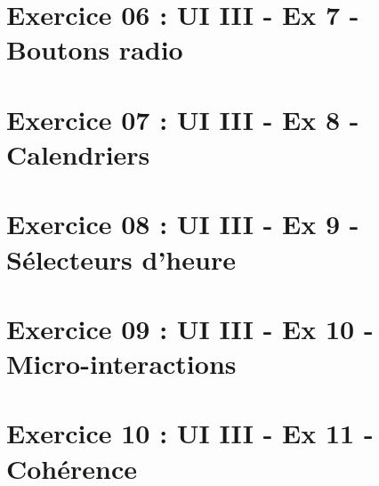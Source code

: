 \documentclass{training}
\begin{document}
\chapter{Exercice 06 : UI III - Ex 7 - Boutons radio}

\chapter{Exercice 07 : UI III - Ex 8 - Calendriers}

\chapter{Exercice 08 : UI III - Ex 9 - Sélecteurs d'heure}

\chapter{Exercice 09 : UI III - Ex 10 - Micro-interactions}

\chapter{Exercice 10 : UI III - Ex 11 - Cohérence}

\end{document}
